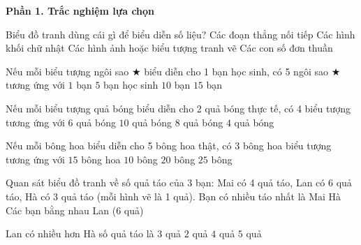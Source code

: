 \textbf{Phần 1. Trắc nghiệm lựa chọn}

\begin{ex} %
Biểu đồ tranh dùng cái gì để biểu diễn số liệu?
\choice
{Các đoạn thẳng nối tiếp}
{Các hình khối chữ nhật}
{\True Các hình ảnh hoặc biểu tượng tranh vẽ}
{Các con số đơn thuần}
\end{ex}

\begin{ex} %
Nếu mỗi biểu tượng ngôi sao $\bigstar$ biểu diễn cho 1 bạn học sinh, có 5 ngôi sao $\bigstar$ tương ứng với
\choice
{$1$ bạn}
{\True $5$ bạn học sinh}
{$10$ bạn}
{$15$ bạn}
\end{ex}

\begin{ex} %
Nếu mỗi biểu tượng quả bóng biểu diễn cho 2 quả bóng thực tế, có 4 biểu tượng tương ứng với
\choice
{$6$ quả bóng}
{$10$ quả bóng}
{\True $8$ quả bóng}
{$4$ quả bóng}
\end{ex}

\begin{ex} %
Nếu mỗi bông hoa biểu diễn cho 5 bông hoa thật, có 3 bông hoa biểu tượng tương ứng với
\choice
{\True $15$ bông hoa}
{$10$ bông}
{$20$ bông}
{$25$ bông}
\end{ex}

\begin{ex} %
Quan sát biểu đồ tranh về số quả táo của 3 bạn: Mai có 4 quả táo, Lan có 6 quả táo, Hà có 3 quả táo (mỗi hình vẽ là 1 quả). Bạn có nhiều táo nhất là
\choice
{Mai}
{Hà}
{Các bạn bằng nhau}
{\True Lan ($6$ quả)}
\end{ex}

\begin{ex} %
Lan có nhiều hơn Hà số quả táo là
\choice
{\True $3$ quả}
{$2$ quả}
{$4$ quả}
{$5$ quả}
\end{ex}


